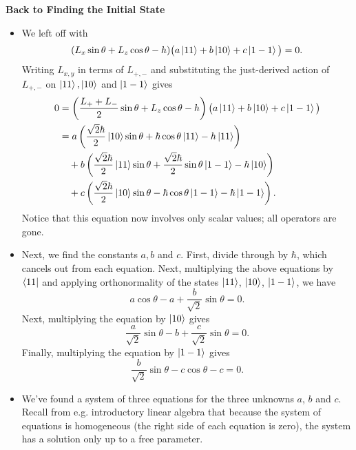 \documentclass[11pt, a4paper]{article}
\begin{document}
\textbf{Back to Finding the Initial State}
\begin{itemize}
	\item We left off with
	\begin{equation*}
		(L_{x}\sin \theta + L_{z}\cos \theta - h)\big(a \ket{11} + b\ket{10} + c\ket{1-1}\big) = 0.
	\end{equation*}
	Writing $ L_{x, y} $ in terms of $ L_{+,-} $ and substituting the just-derived action of $ L_{+,-} $ on $ \ket{11}, \ket{10} $ and $ \ket{1-1} $ gives
	\begin{align*}
		0 &= \left(\frac{L_{+}+L_{-}}{2}\sin \theta + L_{z}\cos \theta - h\right)\big(a \ket{11} + b\ket{10} + c\ket{1-1}\big)\\
		&=a\left(\frac{\sqrt{2}\hbar}{2}\ket{10}\sin \theta + \hbar \cos \theta \ket{11} - h\ket{11}\right) \\
		&{} \quad + b\left(\frac{\sqrt{2}\hbar}{2}\ket{11}\sin \theta + \frac{\sqrt{2}\hbar}{2}\sin \theta\ket{1-1} - \hbar\ket{10}\right)\\
		&{} \quad + c\left(\frac{\sqrt{2}\hbar}{2}\ket{10}\sin \theta -\hbar \cos \theta\ket{1-1} - \hbar\ket{1-1}\right).
	\end{align*}
	Notice that this equation now involves only scalar values; all operators are gone.
	
	\item Next, we find the constants $ a, b $ and $ c $. First, divide through by $ \hbar $, which cancels out from each equation. Next, multiplying the above equations by $ \bra{11} $ and applying orthonormality of the states $ \ket{11} $, $ \ket{10} $, $ \ket{1-1} $, we have
	\begin{equation*}
		a  \cos \theta - a  + \frac{b}{\sqrt{2}} \sin \theta = 0.
	\end{equation*}
	Next, multiplying the equation by $ \ket{10} $ gives
	\begin{equation*}
		\frac{a}{\sqrt{2}}\sin \theta - b  + \frac{c}{\sqrt{2}}\sin \theta = 0.
	\end{equation*}
	Finally, multiplying the equation by $ \ket{1-1} $ gives
	\begin{equation*}
		\frac{b}{\sqrt{2}} \sin \theta - c \cos \theta - c = 0.
	\end{equation*}
	
	\item We've found a system of three equations for the three unknowns $ a $, $ b $ and $ c $. Recall from e.g. introductory linear algebra that because the system of equations is homogeneous (the right side of each equation is zero), the system has a solution only up to a free parameter. 
	

\end{itemize}
\end{document}
